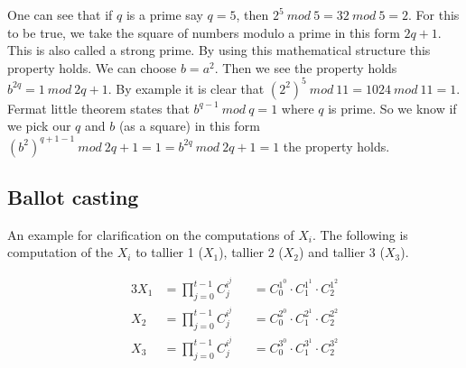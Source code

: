 \noindent
One can see that if \begin{math}q\end{math} is a prime say \begin{math}q=5\end{math}, then \begin{math}2^5 \ mod \ 5 = 32 \ mod \ 5 = 2\end{math}. For this to be true, we take the square of numbers modulo a prime in this form \begin{math}2q+1\end{math}. This is also called a strong prime. By using this mathematical structure this property holds. We can choose \begin{math}b=a^2\end{math}. Then we see the property holds \begin{math}b^{2q} = 1 \ mod \ 2q+1\end{math}. By example it is clear that \begin{math}(2^2)^5 \ mod \ 11 = 1024 \ mod \ 11 = 1\end{math}. Fermat little theorem states that \begin{math}b^{q-1} \ mod \ q = 1\end{math} where \begin{math}q\end{math} is prime. So we know if we pick our \begin{math}q\end{math} and \begin{math}b\end{math} (as a square)  in this form \begin{math}(b^{2})^{q+1-1} \ mod \ 2q+1 =1 =  b^{2q} \ mod \ 2q+1 =1\end{math} the property holds.

\subsection{Ballot casting}
An example for clarification on the computations of \begin{math}X_i\end{math}. The following is computation of the $X_i$ to tallier 1 ($X_1$), tallier 2 ($X_2$) and tallier 3 ($X_3$).

\begin{alignat*}{3}
X_1 &=\prod\limits_{j=0}^{t-1} C_j^{i^j} &&= C_0^{1^0}  \cdot  C_1^{1^1}  \cdot  C_2^{1^2}\\
X_2 &=\prod\limits_{j=0}^{t-1} C_j^{i^j} &&= C_0^{2^0}  \cdot  C_1^{2^1}  \cdot  C_2^{2^2}\\
X_3 &=\prod\limits_{j=0}^{t-1} C_j^{i^j} &&= C_0^{3^0}  \cdot  C_1^{3^1}  \cdot  C_2^{3^2}
\end{alignat*}




